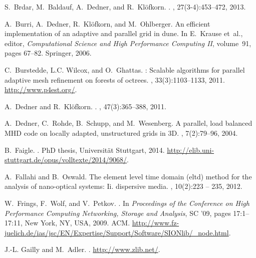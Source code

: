 \documentclass[10pt,notitlepage,a4paper]{article}
\begin{document}
\begin{thebibliography}{10}
S.~Brdar, M.~Baldauf, A.~Dedner, and R.~Kl{\"o}fkorn.
.
, 27(3-4):453--472,
  2013.

A.~Burri, A.~Dedner, R.~Kl{\"o}fkorn, and M.~Ohlberger.
\newblock An efficient implementation of an adaptive and parallel grid in dune.
\newblock In E.~Krause et~al., editor, {\em Computational Science and High
  Performance Computing II}, volume~91, pages 67--82. Springer, 2006.

C.~Burstedde, L.C. Wilcox, and O.~Ghattas.
: Scalable algorithms for parallel adaptive mesh
  refinement on forests of octrees.
, 33(3):1103--1133, 2011.
\newblock \url{http://www.p4est.org/}.

A.~Dedner and R.~Kl{\"o}fkorn.
.
, 47(3):365--388, 2011.

A.~Dedner, C.~Rohde, B.~Schupp, and M.~Wesenberg.
\newblock A parallel, load balanced {M}{H}{D} code on locally adapted,
  unstructured grids in 3{D}.
, 7(2):79--96, 2004.

B.~Faigle.
.
\newblock PhD thesis, Universit{\"a}t Stuttgart, 2014.
\newblock \url{http://elib.uni-stuttgart.de/opus/volltexte/2014/9068/}.

A.~Fallahi and B.~Oswald.
\newblock The element level time domain (eltd) method for the analysis of
  nano-optical systems: Ii. dispersive media.
,
  10(2):223 -- 235, 2012.

W.~Frings, F.~Wolf, and V.~Petkov.
.
\newblock In {\em Proceedings of the Conference on High Performance Computing
  Networking, Storage and Analysis}, SC '09, pages 17:1--17:11, New York, NY,
  USA, 2009. ACM.
\newblock
  \url{http://www.fz-juelich.de/ias/jsc/EN/Expertise/Support/Software/SIONlib/_node.html}.

J.-L. Gailly and M.~Adler.
.
\newblock \url{http://www.zlib.net/}.


\end{thebibliography}
\end{document}
